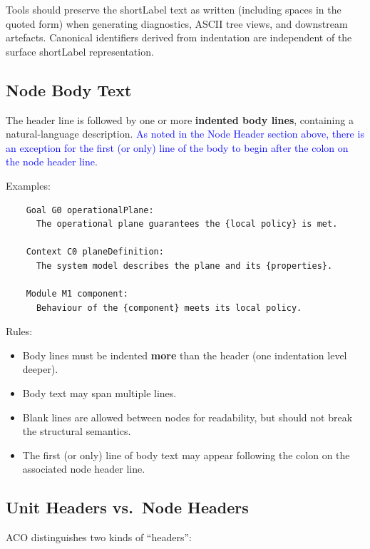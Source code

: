 \documentclass[11pt]{article}
\begin{document}
Tools should preserve the shortLabel text as written (including spaces in the quoted form) when generating diagnostics, ASCII tree views, and downstream artefacts. Canonical identifiers derived from indentation are independent of the surface shortLabel representation.

\subsection{Node Body Text}

The header line is followed by one or more \textbf{indented body lines}, containing a natural-language description. \textcolor{blue}{As noted in the Node Header section above, there is an exception for the first (or only) line of the body to begin after the colon on the node header line.}

Examples:
\begin{verbatim}
    Goal G0 operationalPlane:
      The operational plane guarantees the {local policy} is met.

    Context C0 planeDefinition:
      The system model describes the plane and its {properties}.

    Module M1 component:
      Behaviour of the {component} meets its local policy.
\end{verbatim}

Rules:
\begin{itemize}[leftmargin=2em]
  \item Body lines must be indented \textbf{more} than the header (one indentation level deeper).
  \item Body text may span multiple lines.
  \item Blank lines are allowed between nodes for readability, but should not break the structural semantics.
  \item The first (or only) line of body text may appear following the colon on the associated node header line.
\end{itemize}

\subsection{Unit Headers vs.\ Node Headers}
ACO distinguishes two kinds of ``headers'':
\end{document}
